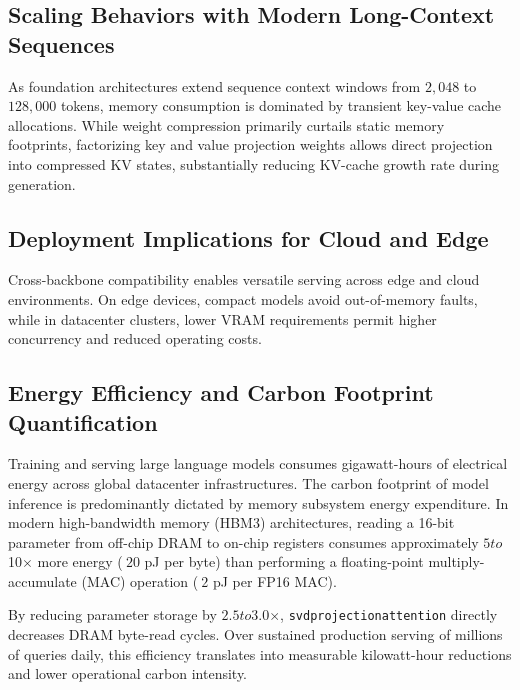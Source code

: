 \subsection{Scaling Behaviors with Modern Long-Context Sequences}
As foundation architectures extend sequence context windows from $2{,}048$ to $128{,}000$ tokens, memory consumption is dominated by transient key-value cache allocations. While weight compression primarily curtails static memory footprints, factorizing key and value projection weights allows direct projection into compressed KV states, substantially reducing KV-cache growth rate during generation.

\subsection{Deployment Implications for Cloud and Edge}
Cross-backbone compatibility enables versatile serving across edge and cloud environments. On edge devices, compact models avoid out-of-memory faults, while in datacenter clusters, lower VRAM requirements permit higher concurrency and reduced operating costs.

\subsection{Energy Efficiency and Carbon Footprint Quantification}
Training and serving large language models consumes gigawatt-hours of electrical energy across global datacenter infrastructures. The carbon footprint of model inference is predominantly dictated by memory subsystem energy expenditure. In modern high-bandwidth memory (HBM3) architectures, reading a 16-bit parameter from off-chip DRAM to on-chip registers consumes approximately $5$\times$ to $10$\times$ more energy ($~20$ pJ per byte) than performing a floating-point multiply-accumulate (MAC) operation ($~2$ pJ per FP16 MAC).

By reducing parameter storage by $2.5$\times$ to $3.0$\times$, \texttt{svdprojectionattention} directly decreases DRAM byte-read cycles. Over sustained production serving of millions of queries daily, this efficiency translates into measurable kilowatt-hour reductions and lower operational carbon intensity.
